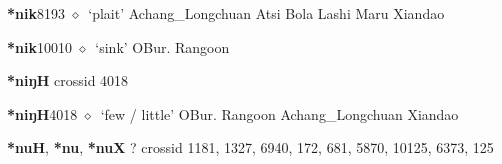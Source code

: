  \begin{list}{}{\leftmargin=1.5em \itemindent=-1.5em}
  \item {\footnotesize \textbf{*nik}}{\tiny 8193}
         $\diamond$~`plait'
         Achang\_Longchuan 
\hspace{1ex}
         Atsi 
\hspace{1ex}
         Bola 
\hspace{1ex}
         Lashi 
\hspace{1ex}
         Maru 
\hspace{1ex}
         Xiandao 
  \item {\footnotesize \textbf{*nik}}{\tiny 10010}
\hspace{1ex}
         $\diamond$~`sink'
         OBur. 
\hspace{1ex}
         Rangoon 
  \end{list}
\item
\textbf{*niŋH}
  {\tiny crossid 4018}
  \begin{list}{}{\leftmargin=1.5em \itemindent=-1.5em}
  \item {\footnotesize \textbf{*niŋH}}{\tiny 4018}
         $\diamond$~`few / little'
         OBur. 
\hspace{1ex}
         Rangoon 
\hspace{1ex}
         Achang\_Longchuan 
\hspace{1ex}
         Xiandao 
  \end{list}
\item
\textbf{*nuH}, \textbf{*nu}, \textbf{*nuX}
?
  {\tiny crossid 1181, 1327, 6940, 172, 681, 5870, 10125, 6373, 125}
